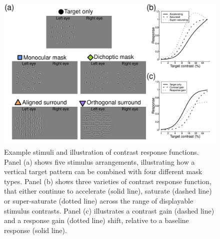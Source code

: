 \documentclass[]{article}
\begin{document}
\begin{figure}

{\centering \includegraphics{figures/stimfig} 

}

\caption{Example stimuli and illustration of contrast response functions. Panel (a) shows five stimulus arrangements, illustrating how a vertical target pattern can be combined with four different mask types. Panel (b) shows three varieties of contrast response function, that either continue to accelerate (solid line), saturate (dashed line) or super-saturate (dotted line) across the range of displayable stimulus contrasts. Panel (c) illustrates a contrast gain (dashed line) and a response gain (dotted line) shift, relative to a baseline response (solid line).}\label{fig:stimfig}
\end{figure}
\end{document}

